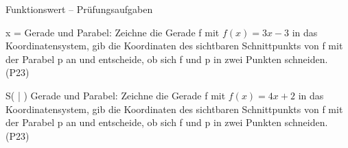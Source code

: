 \begin{aufgabe}{Funktionswert – Prüfungsaufgaben}
\begin{teile}
\begin{ksys}[xmin=-5,xmax=5,ymin=-5,ymax=5,ablesen]  \end{ksys}
x = \leerfeld
\teil Gerade und Parabel: Zeichne die Gerade f mit $f(x) = 3x - 3$ in das Koordinatensystem, gib die Koordinaten des sichtbaren Schnittpunkts von f mit der Parabel p an und entscheide, ob sich f und p in zwei Punkten schneiden. \hfill (P23) \\

\begin{ksys}[xmin=-5,xmax=5,ymin=-6,ymax=8]  \end{ksys}
S( \leerfeld | \leerfeld ) \quad \janein
\teil Gerade und Parabel: Zeichne die Gerade f mit $f(x) = 4x + 2$ in das Koordinatensystem, gib die Koordinaten des sichtbaren Schnittpunkts von f mit der Parabel p an und entscheide, ob sich f und p in zwei Punkten schneiden. \hfill (P23) \\


\end{teile}
\end{aufgabe}
